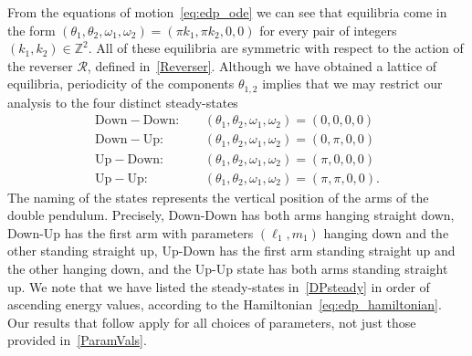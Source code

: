 \documentclass[11pt]{article}
\numberwithin{equation}{section}
\theoremstyle{plain}
\begin{document}
From the equations of motion~\eqref{eq:edp_ode} we can see that equilibria come in the form $(\theta_1,\theta_2,\omega_1,\omega_2) = (\pi k_1,\pi k_2,0,0)$ for every pair of integers $(k_1,k_2) \in \mathbb{Z}^2$. All of these equilibria are symmetric with respect to the action of the reverser $\mathcal{R}$, defined in~\eqref{Reverser}. Although we have obtained a lattice of equilibria, periodicity of the components $\theta_{1,2}$ implies that we may restrict our analysis to the four distinct steady-states
\begin{subequations}\label{DPsteady}
\begin{align}
	\mathrm{Down-Down}: \quad &(\theta_1,\theta_2,\omega_1,\omega_2) = (0,0,0,0) \\
	\mathrm{Down-Up}: \quad &(\theta_1,\theta_2,\omega_1,\omega_2) = (0,\pi,0,0) \\
	\mathrm{Up-Down}: \quad &(\theta_1,\theta_2,\omega_1,\omega_2) = (\pi,0,0,0) \\
	\mathrm{Up-Up}: \quad &(\theta_1,\theta_2,\omega_1,\omega_2) = (\pi,\pi,0,0).
\end{align}  
\end{subequations}
The naming of the states represents the vertical position of the arms of the double pendulum. Precisely, Down-Down has both arms hanging straight down, Down-Up has the first arm with parameters $(\ell_1,m_1)$ hanging down and the other standing straight up, Up-Down has the first arm standing straight up and the other hanging down, and the Up-Up state has both arms standing straight up. We note that we have listed the steady-states in~\eqref{DPsteady} in order of ascending energy values, according to the Hamiltonian~\eqref{eq:edp_hamiltonian}. Our results that follow apply for all choices of parameters, not just those provided in~\eqref{ParamVals}.  
\end{document}
